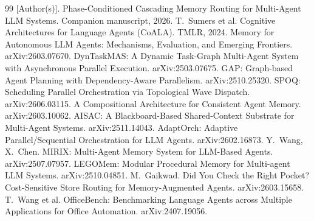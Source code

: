 \documentclass[10pt,twocolumn]{article}
\begin{document}
\begin{thebibliography}{99}\small
{} [Author(s)]. Phase-Conditioned Cascading Memory Routing for Multi-Agent LLM Systems. Companion manuscript, 2026.
 T.~Sumers et al. Cognitive Architectures for Language Agents (CoALA). TMLR, 2024.
 Memory for Autonomous LLM Agents: Mechanisms, Evaluation, and Emerging Frontiers. arXiv:2603.07670.
 DynTaskMAS: A Dynamic Task-Graph Multi-Agent System with Asynchronous Parallel Execution. arXiv:2503.07675.
 GAP: Graph-based Agent Planning with Dependency-Aware Parallelism. arXiv:2510.25320.
 SPOQ: Scheduling Parallel Orchestration via Topological Wave Dispatch. arXiv:2606.03115.
 A Compositional Architecture for Consistent Agent Memory. arXiv:2603.10062.
 AISAC: A Blackboard-Based Shared-Context Substrate for Multi-Agent Systems. arXiv:2511.14043.
 AdaptOrch: Adaptive Parallel/Sequential Orchestration for LLM Agents. arXiv:2602.16873.
 Y.~Wang, X.~Chen. MIRIX: Multi-Agent Memory System for LLM-Based Agents. arXiv:2507.07957.
 LEGOMem: Modular Procedural Memory for Multi-agent LLM Systems. arXiv:2510.04851.
 M.~Gaikwad. Did You Check the Right Pocket? Cost-Sensitive Store Routing for Memory-Augmented Agents. arXiv:2603.15658.
 T.~Wang et al. OfficeBench: Benchmarking Language Agents across Multiple Applications for Office Automation. arXiv:2407.19056.
\end{thebibliography}
\end{document}
